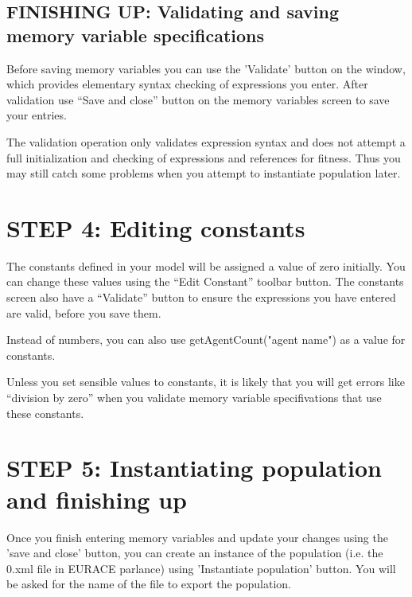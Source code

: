 \subsection{FINISHING UP: Validating and saving memory variable specifications}
Before saving memory variables you can use the 'Validate' button on the window, which provides elementary syntax checking of expressions you enter. After validation use ``Save and close'' button on the memory variables screen to save your entries.

The validation operation only validates expression syntax and does not attempt a full initialization and checking of expressions and references for fitness. Thus you may still catch some problems when you attempt to instantiate population later.


\section{STEP 4: Editing constants}
The constants defined in your model will be assigned a value of zero initially. You can change these values using the ``Edit Constant'' toolbar button. The constants screen also have a ``Validate'' button to ensure the expressions you have entered are valid, before you save them.

Instead of numbers, you can also use getAgentCount("agent name") as a value for constants.

Unless you set sensible values to constants, it is likely that you will get errors like ``division by zero'' when you validate memory variable specifivations that use these constants.

\section{STEP 5: Instantiating population and finishing up}
Once you finish entering memory variables and update your changes using the 'save and close' button, you can create an instance of the population (i.e. the 0.xml file in EURACE parlance) using 'Instantiate population' button. You will be asked for the name of the file to export the population. 

